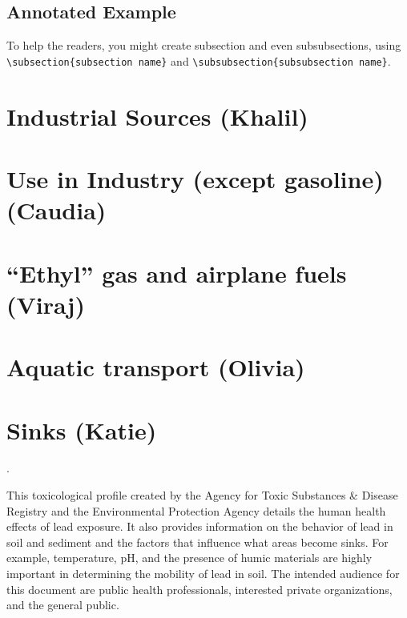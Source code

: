 \documentclass{article}\usepackage[]{graphicx}\usepackage[]{color}
\begin{document}
\subsection{Annotated Example}

\bigskip

\bigskip


To help the readers, you might create subsection and even subsubsections, using \verb!\subsection{subsection name}! and \verb!\subsubsection{subsubsection name}!. 


\section{Industrial Sources (Khalil)}


\section{Use in Industry (except gasoline) (Caudia)}

\section{``Ethyl'' gas and airplane fuels (Viraj)}






\section{Aquatic transport (Olivia)}

\section{Sinks (Katie)}

\noindent {}.
\medskip

This toxicological profile created by the Agency for Toxic Substances \& Disease Registry and the Environmental Protection Agency details the human health effects of lead exposure. It also provides information on the behavior of lead in soil and sediment and the factors that influence what areas become sinks. For example, temperature, pH, and the presence of humic materials are highly important in determining the mobility of lead in soil. The intended audience for this document are public health professionals, interested private organizations, and the general public. 
\end{document}
